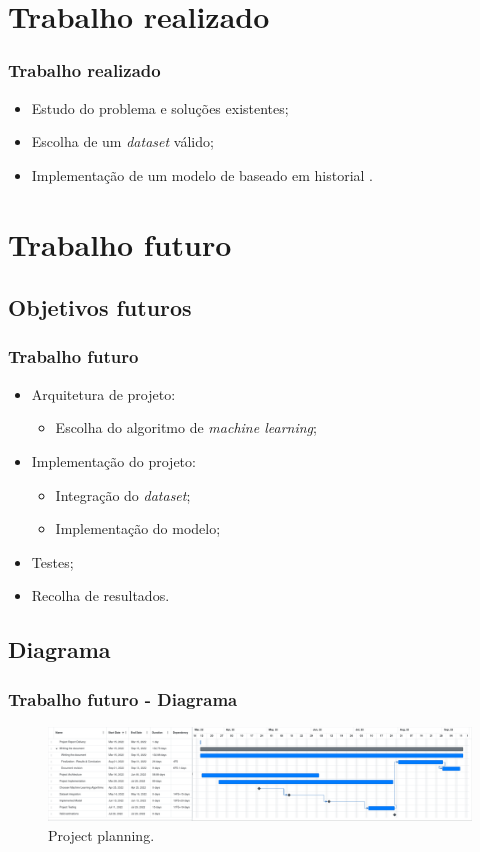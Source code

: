 \documentclass{beamer}
\begin{document}
\section[Trabalho realizado]{Trabalho realizado}
\begin{frame}
\frametitle{Trabalho realizado}

\begin{itemize}
	\item Estudo do problema e soluções existentes;
	\item Escolha de um \textit{dataset} válido;
	\item Implementação de um modelo de baseado em historial .
\end{itemize}

\end{frame}

\section[Trabalho futuro]{Trabalho futuro}
\subsection{Objetivos futuros}
\begin{frame}
\frametitle{Trabalho futuro}

\begin{itemize}
	\item Arquitetura de projeto:
		  \begin{itemize}
			  \item Escolha do algoritmo de \textit{machine learning};
		  \end{itemize} 
	\item Implementação do projeto:
		  \begin{itemize}
		      \item Integração do \textit{dataset};
		      \item Implementação do modelo;
		  \end{itemize}
	\item Testes;
	\item Recolha de resultados.
\end{itemize}

\end{frame}

\subsection{Diagrama}
\begin{frame}
\frametitle{Trabalho futuro - Diagrama}

\begin{figure}[H]
    \begin{center}
        \includegraphics[scale=0.14]{./figures/planning}
        \caption{Project planning.}
    \end{center}
\end{figure}


\end{frame}
\end{document}
